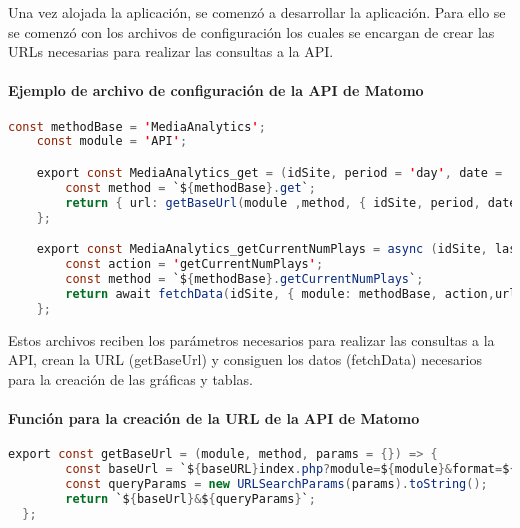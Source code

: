 Una vez alojada la aplicación, se comenzó a desarrollar la aplicación. Para ello se se comenzó con los archivos de configuración
los cuales se encargan de crear las URLs necesarias para realizar las consultas a la API. 

\paragraph{Ejemplo de archivo de configuración de la API de Matomo}
\begin{lstlisting}[language=Java]
    const methodBase = 'MediaAnalytics';
    const module = 'API';

    export const MediaAnalytics_get = (idSite, period = 'day', date = '2023-12-01,2024-07-01') => {
        const method = `${methodBase}.get`;
        return { url: getBaseUrl(module ,method, { idSite, period, date }), title: 'Overall Metrics' };
    };

    export const MediaAnalytics_getCurrentNumPlays = async (idSite, lastMinutes = 180) => {
        const action = 'getCurrentNumPlays';
        const method = `${methodBase}.getCurrentNumPlays`;
        return await fetchData(idSite, { module: methodBase, action,url: getBaseUrl(module ,method, { idSite, lastMinutes })});
    };

\end{lstlisting}

Estos archivos reciben los parámetros necesarios para realizar las consultas a la API, crean la URL (getBaseUrl) y consiguen los
datos (fetchData) necesarios para la creación de las gráficas y tablas. 

\paragraph{Función para la creación de la URL de la API de Matomo}
\begin{lstlisting}[language=Java]
    export const getBaseUrl = (module, method, params = {}) => {
        const baseUrl = `${baseURL}index.php?module=${module}&format=${format}&method=${method}&token_auth=${token_auth}`;
        const queryParams = new URLSearchParams(params).toString();
        return `${baseUrl}&${queryParams}`;
  };
\end{lstlisting}

